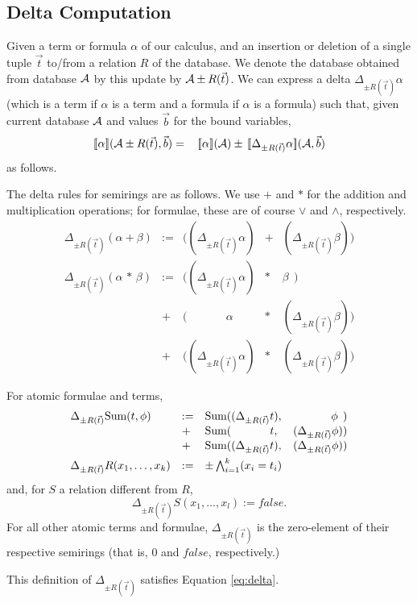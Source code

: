 \subsection{Delta Computation}


\def\dt{\Delta_{\pm R(\vec{t})}}


Given a term or formula $\alpha$
of our calculus, and an insertion or deletion of a
single tuple $\vec{t}$ to/from a relation $R$ of the database.
We denote the database obtained from database $\db$ by this update by
$\db \pm R(\vec{t})$.
We can express a delta $\Delta_{\pm R(\vec{t})} \alpha$
(which is a term if $\alpha$ is a term and a formula if $\alpha$ is a formula)
such that,
given current database $\db$ and values $\vec{b}$ for the bound variables,
\begin{eqnarray}
\Bracks{\alpha}(\db \pm R(\vec{t}), \vec{b}) &=&
\,\Bracks{\alpha}(\db) \pm \,\Bracks{\dt \alpha}(\db, \vec{b})
\label{eq:delta}
\end{eqnarray}
as follows.

The delta rules for semirings are as follows. We use $+$ and $*$ for the
addition and multiplication operations; for formulae, these are of course
$\lor$ and $\land$, respectively.
\[\begin{array}{lllcr}
\dt (\alpha + \beta) &:=& ((\dt \alpha)    &+& (\dt \beta))
\\[1ex]
\dt (\alpha \,*\, \beta)
   &:=& ((\dt \alpha)               &*& \beta\;\,) \\
   &+ & (\quad\quad\quad\;\, \alpha &*& (\dt \beta)) \\
   &+ & ((\dt \alpha)               &*& (\dt \beta))
\end{array}\]

For atomic formulae and terms,
\[\begin{array}{lllr}
\dt \AggSum(t, \phi)
   &:=& \AggSum((\dt t), & \phi\;\,) \\
   &+ & \AggSum(\quad\quad\quad\; \,t,  & (\dt \phi)) \\
   &+ & \AggSum((\dt t), & (\dt \phi))
\\[1ex]
\dt R(x_1, \dots, x_k) &:=& \pm \bigwedge_{i=1}^k (x_i = t_i)
\end{array}\]
and, for $S$ a relation different from $R$,
\[
\dt S(x_1, \dots, x_l) := \textit{false}.
\]
For all other atomic terms and formulae, $\dt$ is the zero-element
of their respective semirings (that is, $0$ and $\textit{false}$,
respectively.)


\begin{proposition}
This definition of $\dt$ satisfies Equation \ref{eq:delta}.
\end{proposition}

